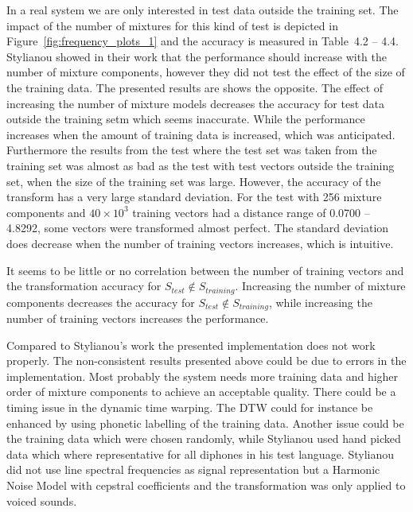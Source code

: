 In a real system we are only interested in test data outside the training set. The impact of the number of mixtures for this kind of test is depicted in Figure~\ref{fig:frequency_plots_1} and the accuracy is measured in Table~4.2 -- 4.4. Stylianou \etal \cite{stylianou98} showed in their work that the performance should increase with the number of mixture components, however they did not test the effect of the size of the training data. The presented results are shows the opposite. The effect of increasing the number of mixture models decreases the accuracy for test data outside the training setm which seems inaccurate. While the performance increases when the amount of training data is increased, which was anticipated. Furthermore the results from the test where the test set was taken from the training set was almost as bad as the test with test vectors outside the training set, when the size of the training set was large. However, the accuracy of the transform has a very large standard deviation. For the test with 256 mixture components and $40\times 10^3$ training vectors had a distance range of 0.0700 -- 4.8292, \ie some vectors were transformed almost perfect. The standard deviation does decrease when the number of training vectors increases, which is intuitive. 

It seems to be little or no correlation between the number of training vectors and the transformation accuracy for $S_{test}\notin S_{training}$. Increasing the number of mixture components decreases the accuracy for $S_{test}\notin S_{training}$, while increasing the number of training vectors increases the performance.

Compared to Stylianou's work \cite{stylianou98} the presented implementation does not work properly. The non-consistent results presented above could be due to errors in the implementation. Most probably the system needs more training data and higher order of mixture components to achieve an acceptable quality. There could be a timing issue in the dynamic time warping. The DTW could for instance be enhanced by using phonetic labelling of the training data. Another issue could be the training data which were chosen randomly, while Stylianou used hand picked data which where representative for all diphones in his test language. Stylianou did not use line spectral frequencies as signal representation but a Harmonic Noise Model with cepstral coefficients and the transformation was only applied to voiced sounds. 




